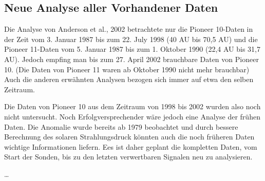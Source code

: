 \subsection{Neue Analyse aller Vorhandener Daten}
Die Analyse von Anderson et al., 2002 betrachtete nur die Pioneer 10-Daten in der Zeit vom 3. Januar 1987 bis zum 22.
July 1998 (40 AU bis 70,5 AU) und die Pioneer 11-Daten vom 5. Januar 1987 bis zum 1. Oktober 1990 (22,4 AU bis 31,7
AU). Jedoch empfing man bis zum 27. April 2002 brauchbare Daten von Pioneer 10. (Die Daten von Pioneer 11 waren ab
Oktober 1990 nicht mehr brauchbar) Auch die anderen erwähnten Analysen bezogen sich immer auf etwa den selben Zeitraum.

Die Daten von Pioneer 10 aus dem Zeitraum von 1998 bis 2002 wurden also noch nicht untersucht. Noch
Erfolgversprechender wäre jedoch eine Analyse der frühen Daten. Die Anomalie wurde bereits ab 1979 beobachtet und durch
bessere Berechnung des solaren Strahlungsdruck könnten auch die noch früheren Daten wichtige Informationen liefern. Ees
ist daher geplant die kompletten Daten, vom Start der Sonden, bis zu den letzten verwertbaren Signalen neu zu
analysieren.


\bigskip
…
\bigskip

